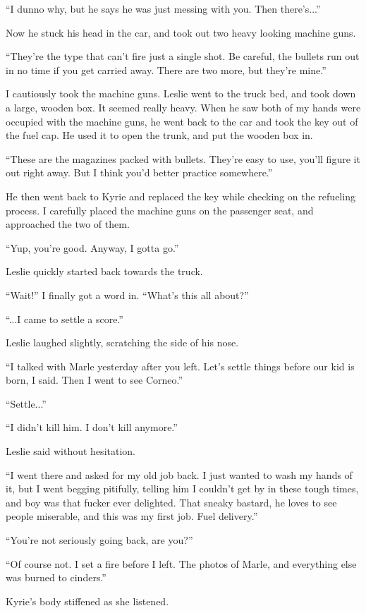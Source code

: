 \documentclass[oneside]{book}
\begin{document}
“I dunno why, but he says he was just messing with you. Then there’s...”

Now he stuck his head in the car, and took out two heavy looking machine guns.

“They’re the type that can’t fire just a single shot. Be careful, the bullets run out in no time if you get carried away. There are two more, but they’re mine.”

I cautiously took the machine guns. Leslie went to the truck bed, and took down a large, wooden box. It seemed really heavy. When he saw both of my hands were occupied with the machine guns, he went back to the car and took the key out of the fuel cap. He used it to open the trunk, and put the wooden box in.

“These are the magazines packed with bullets. They’re easy to use, you’ll figure it out right away. But I think you’d better practice somewhere.”

He then went back to Kyrie and replaced the key while checking on the refueling process. I carefully placed the machine guns on the passenger seat, and approached the two of them.

“Yup, you’re good. Anyway, I gotta go.”

Leslie quickly started back towards the truck.

“Wait!” I finally got a word in. “What’s this all about?”

“...I came to settle a score.”

Leslie laughed slightly, scratching the side of his nose.

“I talked with Marle yesterday after you left. Let’s settle things before our kid is born, I said. Then I went to see Corneo.”

“Settle...”

“I didn’t kill him. I don’t kill anymore.”

Leslie said without hesitation.

“I went there and asked for my old job back. I just wanted to wash my hands of it, but I went begging pitifully, telling him I couldn’t get by in these tough times, and boy was that fucker ever delighted. That sneaky bastard, he loves to see people miserable, and this was my first job. Fuel delivery.”

“You’re not seriously going back, are you?”

“Of course not. I set a fire before I left. The photos of Marle, and everything else was burned to cinders.”

Kyrie’s body stiffened as she listened.
\end{document}
